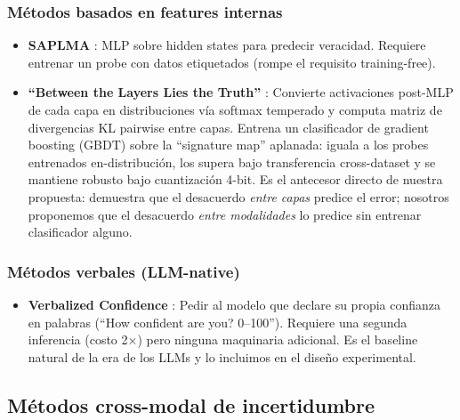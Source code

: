 \documentclass[12pt,a4paper]{article}
\begin{document}
\subsubsection{Métodos basados en features internas}

\begin{itemize}[leftmargin=2em]
    \item \textbf{SAPLMA} \citep{azaria2023internal}: MLP sobre hidden states para predecir veracidad.
    Requiere entrenar un probe con datos etiquetados (rompe el requisito training-free).

    \item \textbf{``Between the Layers Lies the Truth''} \citep{badash2026between}: Convierte activaciones post-MLP de cada capa en distribuciones vía softmax temperado y computa matriz de divergencias KL pairwise entre capas.
    Entrena un clasificador de gradient boosting (GBDT) sobre la ``signature map'' aplanada: iguala a los probes entrenados en-distribución, los supera bajo transferencia cross-dataset y se mantiene robusto bajo cuantización 4-bit.
    Es el antecesor directo de nuestra propuesta: demuestra que el desacuerdo \textit{entre capas} predice el error; nosotros proponemos que el desacuerdo \textit{entre modalidades} lo predice sin entrenar clasificador alguno.
\end{itemize}

\subsubsection{Métodos verbales (LLM-native)}

\begin{itemize}[leftmargin=2em]
    \item \textbf{Verbalized Confidence} \citep{kadavath2022language, lin2022teaching}: Pedir al modelo que declare su propia confianza en palabras (``How confident are you? 0--100'').
    Requiere una segunda inferencia (costo 2$\times$) pero ninguna maquinaria adicional.
    Es el baseline natural de la era de los LLMs y lo incluimos en el diseño experimental.
\end{itemize}

\subsection{Métodos cross-modal de incertidumbre}
\end{document}
